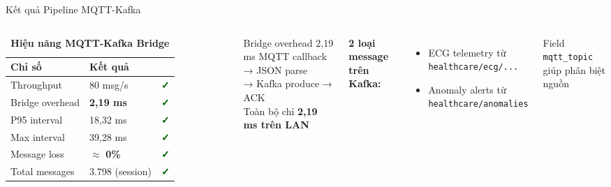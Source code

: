 \documentclass[aspectratio=169, 12pt]{beamer}
\newcommand{\cmark}{\textcolor{darkgreen}{\textbf{✓}}}
\begin{document}
\begin{frame}{Kết quả Pipeline MQTT-Kafka}

\begin{columns}[T]
\begin{table}
\caption*{\textbf{Hiệu năng MQTT-Kafka Bridge}}
\renewcommand{\arraystretch}{1.25}
\begin{tabular}{lll}
\toprule
\textbf{Chỉ số} & \textbf{Kết quả} & \\
\midrule
Throughput     & 80 msg/s        & \cmark \\
Bridge overhead & \textbf{2,19 ms} & \cmark \\
P95 interval   & 18,32 ms        & \cmark \\
Max interval   & 39,28 ms        & \cmark \\
Message loss   & $\approx$ \textbf{0\%} & \cmark \\
Total messages & 3.798 (session) & \cmark \\
\bottomrule
\end{tabular}
\end{table}

\begin{exampleblock}{Bridge overhead 2,19 ms}
MQTT callback → JSON parse\\
→ Kafka produce → ACK\\
Toàn bộ chỉ \textbf{2,19 ms trên LAN}
\end{exampleblock}

\vspace{0.3cm}
\textbf{2 loại message trên Kafka:}
\begin{itemize}
  \item ECG telemetry từ \texttt{healthcare/ecg/...}
  \item Anomaly alerts từ \texttt{healthcare/anomalies}
\end{itemize}
Field \texttt{mqtt\_topic} giúp phân biệt nguồn
\end{columns}

\end{frame}
\end{document}
